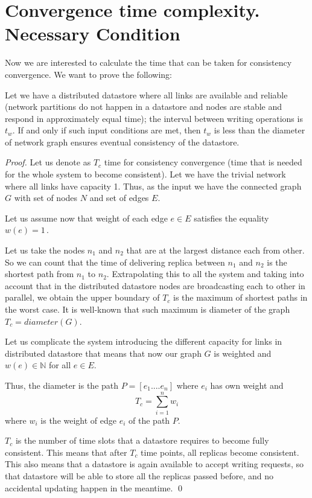 \documentclass[a4paper,14pt]{llncs}
\begin{document}
\section{Convergence time complexity. Necessary Condition}\label{sec:complexity}

Now we are interested to calculate the time that can be taken for consistency convergence.
We want to prove the following:
\begin{proposition}\label{prop}
Let we have a distributed datastore where all links are available and reliable (network partitions do not happen in a datastore and nodes are stable and respond in approximately equal time); the interval between writing operations is $t_w$.
If and only if such input conditions are met, then $t_w$ is less than the diameter of network graph ensures eventual consistency of the datastore.
\end{proposition}
\begin{proof}
Let us denote as $T_c$ time for consistency convergence (time that is needed for the whole system to become consistent).
Let we have the trivial network where all links have capacity 1.
Thus, as the input we have the connected graph
$G$ with set of nodes $N$ and set of edges $E$. 
\par\noindent Let us assume now that weight of each edge $e\in E$ satisfies the equality $w(e) = 1$\,.
\par\noindent
Let us take the nodes $n_1$ and  $n_2$ that are at the largest distance each from other. So we can count that the time of delivering replica between $n_1$ and $n_2$ is the shortest path from $n_1$ to $n_2$.
Extrapolating this to all the system and taking into account that in the distributed datastore nodes are broadcasting each to other in parallel,  we obtain the upper boundary of $T_c$ is the maximum of shortest paths in the worst case.
It is well-known that such maximum is diameter of the graph $T_c = diameter(G)$.
\par\noindent Let us complicate the system introducing the different capacity for links in distributed datastore that means that now our graph $G$ is weighted and 
$w(e) \in\mathbb{N}$ for all $e\in E$.
\par\noindent
Thus, the diameter is the path $P = [e_1....e_n]$ where $e_i$ has own weight and
\[
	T_c = \sum_{i=1}^{n}w_i
\]
where $w_i$ is the weight of edge $e_i$ of the path $P$.
\par\noindent
$T_c$ is the number of time slots that a datastore requires to become fully consistent.
This means that after $T_c$ time points, all replicas become consistent.
This also means that a datastore is again available to accept writing requests, so that datastore will be able to store all the replicas passed before, and no accidental updating happen in the meantime.
\qed
\end{proof}
\end{document}

